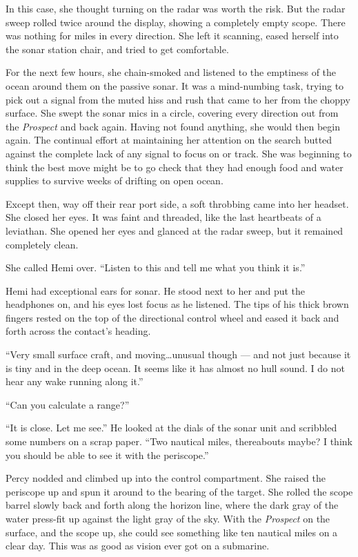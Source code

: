 \documentclass[
]{scrbook}
\begin{document}
In this case, she thought turning on the radar was worth the risk. But
the radar sweep rolled twice around the display, showing a completely
empty scope. There was nothing for miles in every direction. She left it
scanning, eased herself into the sonar station chair, and tried to get
comfortable.

For the next few hours, she chain-smoked and listened to the emptiness
of the ocean around them on the passive sonar. It was a mind-numbing
task, trying to pick out a signal from the muted hiss and rush that came
to her from the choppy surface. She swept the sonar mics in a circle,
covering every direction out from the \emph{Prospect} and back again.
Having not found anything, she would then begin again. The continual
effort at maintaining her attention on the search butted against the
complete lack of any signal to focus on or track. She was beginning to
think the best move might be to go check that they had enough food and
water supplies to survive weeks of drifting on open ocean.

Except then, way off their rear port side, a soft throbbing came into
her headset. She closed her eyes. It was faint and threaded, like the
last heartbeats of a leviathan. She opened her eyes and glanced at the
radar sweep, but it remained completely clean.

She called Hemi over. ``Listen to this and tell me what you think it
is.''

Hemi had exceptional ears for sonar. He stood next to her and put the
headphones on, and his eyes lost focus as he listened. The tips of his
thick brown fingers rested on the top of the directional control wheel
and eased it back and forth across the contact's heading.

``Very small surface craft, and moving\ldots unusual though --- and not
just because it is tiny and in the deep ocean. It seems like it has
almost no hull sound. I do not hear any wake running along it.''

``Can you calculate a range?''

``It is close. Let me see.'' He looked at the dials of the sonar unit
and scribbled some numbers on a scrap paper. ``Two nautical miles,
thereabouts maybe? I think you should be able to see it with the
periscope.''

Percy nodded and climbed up into the control compartment. She raised the
periscope up and spun it around to the bearing of the target. She rolled
the scope barrel slowly back and forth along the horizon line, where the
dark gray of the water press-fit up against the light gray of the sky.
With the \emph{Prospect} on the surface, and the scope up, she could see
something like ten nautical miles on a clear day. This was as good as
vision ever got on a submarine.
\end{document}
